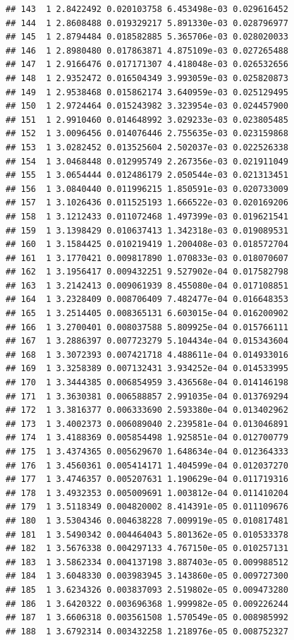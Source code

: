 \documentclass[article]{jss}\usepackage[]{graphicx}\usepackage[]{xcolor}
\makeatletter
\newenvironment{kframe}{%
 \def\at@end@of@kframe{}%
 \ifinner\ifhmode%
  \def\at@end@of@kframe{\end{minipage}}%
  \begin{minipage}{\columnwidth}%
 \fi\fi%
 \def\FrameCommand##1{\hskip\@totalleftmargin \hskip-\fboxsep
 \colorbox{shadecolor}{##1}\hskip-\fboxsep
     \hskip-\linewidth \hskip-\@totalleftmargin \hskip\columnwidth}%
 \MakeFramed {\advance\hsize-\width
   \@totalleftmargin\z@ \linewidth\hsize
   \@setminipage}}%
 {\par\unskip\endMakeFramed%
 \at@end@of@kframe}
\newenvironment{knitrout}{}{} %
\makeatother
\begin{document}
\begin{knitrout}
\begin{kframe}
\begin{verbatim}
## 143  1 2.8422492 0.020103758 6.453498e-03 0.029616452
## 144  1 2.8608488 0.019329217 5.891330e-03 0.028796977
## 145  1 2.8794484 0.018582885 5.365706e-03 0.028020033
## 146  1 2.8980480 0.017863871 4.875109e-03 0.027265488
## 147  1 2.9166476 0.017171307 4.418048e-03 0.026532656
## 148  1 2.9352472 0.016504349 3.993059e-03 0.025820873
## 149  1 2.9538468 0.015862174 3.640959e-03 0.025129495
## 150  1 2.9724464 0.015243982 3.323954e-03 0.024457900
## 151  1 2.9910460 0.014648992 3.029233e-03 0.023805485
## 152  1 3.0096456 0.014076446 2.755635e-03 0.023159868
## 153  1 3.0282452 0.013525604 2.502037e-03 0.022526338
## 154  1 3.0468448 0.012995749 2.267356e-03 0.021911049
## 155  1 3.0654444 0.012486179 2.050544e-03 0.021313451
## 156  1 3.0840440 0.011996215 1.850591e-03 0.020733009
## 157  1 3.1026436 0.011525193 1.666522e-03 0.020169206
## 158  1 3.1212433 0.011072468 1.497399e-03 0.019621541
## 159  1 3.1398429 0.010637413 1.342318e-03 0.019089531
## 160  1 3.1584425 0.010219419 1.200408e-03 0.018572704
## 161  1 3.1770421 0.009817890 1.070833e-03 0.018070607
## 162  1 3.1956417 0.009432251 9.527902e-04 0.017582798
## 163  1 3.2142413 0.009061939 8.455080e-04 0.017108851
## 164  1 3.2328409 0.008706409 7.482477e-04 0.016648353
## 165  1 3.2514405 0.008365131 6.603015e-04 0.016200902
## 166  1 3.2700401 0.008037588 5.809925e-04 0.015766111
## 167  1 3.2886397 0.007723279 5.104434e-04 0.015343604
## 168  1 3.3072393 0.007421718 4.488611e-04 0.014933016
## 169  1 3.3258389 0.007132431 3.934252e-04 0.014533995
## 170  1 3.3444385 0.006854959 3.436568e-04 0.014146198
## 171  1 3.3630381 0.006588857 2.991035e-04 0.013769294
## 172  1 3.3816377 0.006333690 2.593380e-04 0.013402962
## 173  1 3.4002373 0.006089040 2.239581e-04 0.013046891
## 174  1 3.4188369 0.005854498 1.925851e-04 0.012700779
## 175  1 3.4374365 0.005629670 1.648634e-04 0.012364333
## 176  1 3.4560361 0.005414171 1.404599e-04 0.012037270
## 177  1 3.4746357 0.005207631 1.190629e-04 0.011719316
## 178  1 3.4932353 0.005009691 1.003812e-04 0.011410204
## 179  1 3.5118349 0.004820002 8.414391e-05 0.011109676
## 180  1 3.5304346 0.004638228 7.009919e-05 0.010817481
## 181  1 3.5490342 0.004464043 5.801362e-05 0.010533378
## 182  1 3.5676338 0.004297133 4.767150e-05 0.010257131
## 183  1 3.5862334 0.004137198 3.887403e-05 0.009988512
## 184  1 3.6048330 0.003983945 3.143860e-05 0.009727300
## 185  1 3.6234326 0.003837093 2.519802e-05 0.009473280
## 186  1 3.6420322 0.003696368 1.999982e-05 0.009226244
## 187  1 3.6606318 0.003561508 1.570549e-05 0.008985992
## 188  1 3.6792314 0.003432258 1.218976e-05 0.008752327

\end{verbatim}
\end{kframe}
\end{knitrout}
\end{document}
